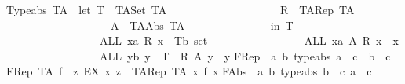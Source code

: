 \begin{isabellebody}
{\isachardoublequoteopen}Typeabs\ TA\ {\isacharequal}{\isacharequal}\ {\isacharparenleft}let\ T\ {\isacharequal}\ TASet\ TA{\isacharsemicolon}\ \isanewline
\ \ \ \ \ \ \ \ \ \ \ \ \ \ \ \ \ \ \ R\ {\isacharequal}\ TARep\ TA{\isacharsemicolon}\isanewline
\ \ \ \ \ \ \ \ \ \ \ \ \ \ \ \ \ \ \ A\ {\isacharequal}\ TAAbs\ TA\isanewline
\ \ \ \ \ \ \ \ \ \ \ \ \ \ \ in\ T\ {\isachartilde}{\isacharequal}\ {\isacharbraceleft}{\isacharbraceright}\ \isanewline
\ \ \ \ \ \ \ \ \ \ \ \ \ \ \ \ {\isacharampersand}\ {\isacharparenleft}ALL\ {\isacharparenleft}x{\isacharcolon}{\isacharcolon}{\isacharprime}a{\isacharparenright}{\isachardot}\ {\isacharparenleft}R\ x{\isacharparenright}\ {\isacharcolon}\ {\isacharparenleft}T{\isacharcolon}{\isacharcolon}{\isacharprime}b\ set{\isacharparenright}{\isacharparenright}\isanewline
\ \ \ \ \ \ \ \ \ \ \ \ \ \ \ \ {\isacharampersand}\ {\isacharparenleft}ALL\ {\isacharparenleft}x{\isacharcolon}{\isacharcolon}{\isacharprime}a{\isacharparenright}{\isachardot}\ {\isacharparenleft}A\ {\isacharparenleft}R\ x{\isacharparenright}{\isacharparenright}\ {\isacharequal}\ x{\isacharparenright}\isanewline
\ \ \ \ \ \ \ \ \ \ \ \ \ \ \ \ {\isacharampersand}\ {\isacharparenleft}ALL\ {\isacharparenleft}y{\isacharcolon}{\isacharcolon}{\isacharprime}b{\isacharparenright}{\isachardot}\ y\ {\isacharcolon}\ T\ {\isacharminus}{\isacharminus}{\isachargreater}\ {\isacharparenleft}R\ {\isacharparenleft}A\ y{\isacharparenright}{\isacharparenright}\ {\isacharequal}\ y{\isacharparenright}{\isacharparenright}{\isachardoublequoteclose}\isanewline
\isanewline
\isanewline
\isanewline
\isanewline
FRep\ {\isacharcolon}{\isacharcolon}\ {\isachardoublequoteopen}{\isacharbrackleft}{\isacharparenleft}{\isacharprime}a{\isacharcomma}\ {\isacharprime}b{\isacharparenright}\ typeabs{\isacharcomma}\ {\isacharprime}a\ {\isacharequal}{\isachargreater}\ {\isacharprime}c{\isacharbrackright}\ {\isacharequal}{\isachargreater}\ {\isacharparenleft}{\isacharprime}b\ {\isacharless}{\isacharequal}{\isachargreater}\ {\isacharprime}c{\isacharparenright}{\isachardoublequoteclose}\isanewline
{\isachardoublequoteopen}FRep\ TA\ f\ {\isacharequal}{\isacharequal}\ {\isacharbraceleft}z{\isachardot}\ EX\ x{\isachardot}\ z\ {\isacharequal}\ {\isacharparenleft}{\isacharparenleft}TARep\ TA\ x{\isacharparenright}{\isacharcomma}\ {\isacharparenleft}f\ x{\isacharparenright}{\isacharparenright}{\isacharbraceright}{\isachardoublequoteclose}\isanewline
\isanewline
FAbs\ {\isacharcolon}{\isacharcolon}\ {\isachardoublequoteopen}{\isacharbrackleft}{\isacharparenleft}{\isacharprime}a{\isacharcomma}\ {\isacharprime}b{\isacharparenright}\ typeabs{\isacharcomma}\ {\isacharparenleft}{\isacharprime}b\ {\isacharless}{\isacharequal}{\isachargreater}\ {\isacharprime}c{\isacharparenright}{\isacharcomma}\ {\isacharprime}a{\isacharbrackright}\ {\isacharequal}{\isachargreater}\ {\isacharprime}c{\isachardoublequoteclose}\isanewline

\end{isabellebody}
